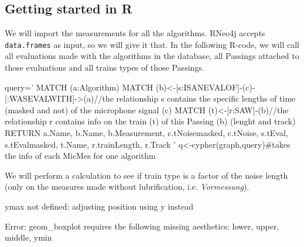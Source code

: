 \documentclass{article}\usepackage[]{graphicx}\usepackage[]{color}
\begin{document}
\subsection{Getting started in R}

We will import the measurements for all the algorithms. RNeo4j accepts {\tt data.frames} as input, so we will give it that. In the following R-code, we will call all evaluations made with the algorithms in the database, all Passings attached to those evaluations and all trains types of those Passings.

\begin{Schunk}
\begin{Sinput}
query='
MATCH (a:Algorithm)
MATCH (b)<-[s:ISANEVALOF]-(c)-[:WASEVALWITH]->(a)//the relationship s contains the specific lengths of time (masked and not) of the microphone signal (c)
MATCH (t)<-[r:SAW]-(b)//the relationship r contains info on the train (t) of this Passing (b) (lenght and track)
RETURN a.Name, b.Name, b.Measurement, c.tNoisemasked, c.tNoise, s.tEval, s.tEvalmasked, t.Name, r.trainLength, r.Track
'
q<-cypher(graph,query)#takes the info of each MicMes for one algorithm
\end{Sinput}
\end{Schunk}






We will perform a calculation to see if train type is a factor of the noise length (only on the measures made without lubrification, i.e. {\it Vormessung}).

\begin{Schunk}
\begin{Soutput}
ymax not defined: adjusting position using y instead
\end{Soutput}
\begin{Soutput}
Error: geom_boxplot requires the following missing aesthetics: lower, upper, middle, ymin
\end{Soutput}
\end{Schunk}
\end{document}
